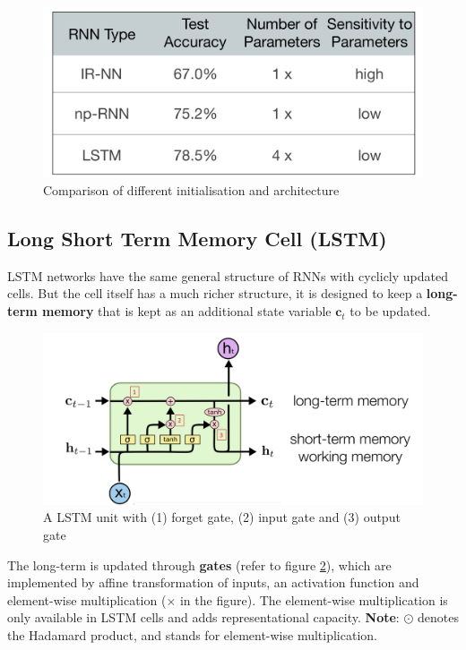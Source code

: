\documentclass[11pt]{article}
\begin{document}
\begin{figure}[H]
	\centering
	\includegraphics[width=0.6\linewidth]{img/rnn_initialisation_comparison}
	\caption{Comparison of different initialisation and architecture}
	\label{fig:rnninitialisationcomparison}
\end{figure}

\subsection{Long Short Term Memory Cell (LSTM)}
LSTM networks have the same general structure of RNNs with cyclicly updated cells. But the cell itself has a much richer structure, it is designed to keep a \textbf{long-term memory} that is kept as an additional state variable $\textbf{c}_t$ to be updated.

\begin{figure}[H]
	\centering
	\includegraphics[width=0.6\linewidth]{img/LSTM_unit_cell}
	\caption{A LSTM unit with (1) forget gate, (2) input gate and (3) output gate}
	\label{fig:lstmunitcell}
\end{figure}

The long-term is updated through \textbf{gates} (refer to figure \ref{fig:lstmunitcell}), which are implemented by affine transformation of inputs, an activation function and element-wise multiplication ($\times$ in the figure). The element-wise multiplication is only available in LSTM cells and adds representational capacity. \textbf{Note}: $\odot$ denotes the Hadamard product, and stands for element-wise multiplication.
\end{document}
